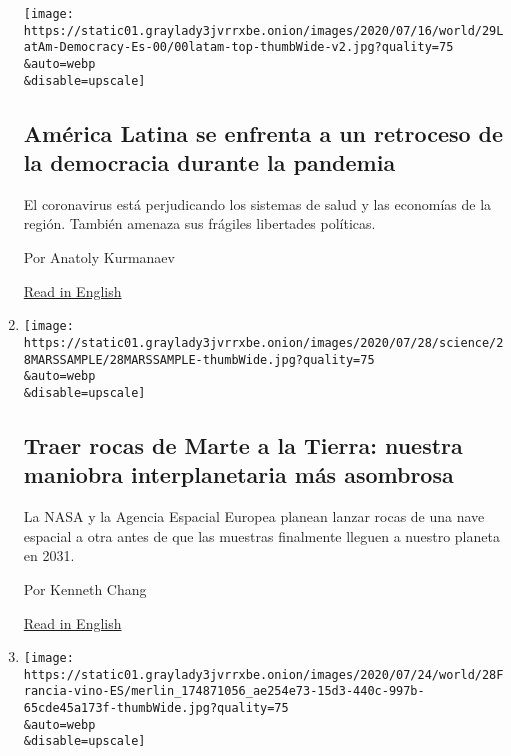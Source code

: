 \begin{enumerate}
  \texttt{[image: https://static01.graylady3jvrrxbe.onion/images/2020/07/16/world/29LatAm-Democracy-Es-00/00latam-top-thumbWide-v2.jpg?quality=75\\\&auto=webp\\\&disable=upscale]}

  \hypertarget{amuxe9rica-latina-se-enfrenta-a-un-retroceso-de-la-democracia-durante-la-pandemia}{%
  \subsection{América Latina se enfrenta a un retroceso de la democracia
  durante la
  pandemia}\label{amuxe9rica-latina-se-enfrenta-a-un-retroceso-de-la-democracia-durante-la-pandemia}}

  El coronavirus está perjudicando los sistemas de salud y las economías
  de la región. También amenaza sus frágiles libertades políticas.

  Por Anatoly Kurmanaev

  \href{https://www.nytimes3xbfgragh.onion/2020/07/29/world/americas/latin-america-democracy-pandemic.html}{Read
  in English}
\item
  \href{/es/2020/07/29/espanol/ciencia-y-tecnologia/mision-marte-nasa.html}{}

  \texttt{[image: https://static01.graylady3jvrrxbe.onion/images/2020/07/28/science/28MARSSAMPLE/28MARSSAMPLE-thumbWide.jpg?quality=75\\\&auto=webp\\\&disable=upscale]}

  \hypertarget{traer-rocas-de-marte-a-la-tierra-nuestra-maniobra-interplanetaria-muxe1s-asombrosa}{%
  \subsection{Traer rocas de Marte a la Tierra: nuestra maniobra
  interplanetaria más
  asombrosa}\label{traer-rocas-de-marte-a-la-tierra-nuestra-maniobra-interplanetaria-muxe1s-asombrosa}}

  La NASA y la Agencia Espacial Europea planean lanzar rocas de una nave
  espacial a otra antes de que las muestras finalmente lleguen a nuestro
  planeta en 2031.

  Por Kenneth Chang

  \href{https://www.nytimes3xbfgragh.onion/2020/07/28/science/mars-sample-return-mission.html}{Read
  in English}
\item
  \href{/es/2020/07/28/espanol/mundo/vino-blanco-alsacia-coronavirus.html}{}

  \texttt{[image: https://static01.graylady3jvrrxbe.onion/images/2020/07/24/world/28Francia-vino-ES/merlin\_174871056\_ae254e73-15d3-440c-997b-65cde45a173f-thumbWide.jpg?quality=75\\\&auto=webp\\\&disable=upscale]}


\end{enumerate}
